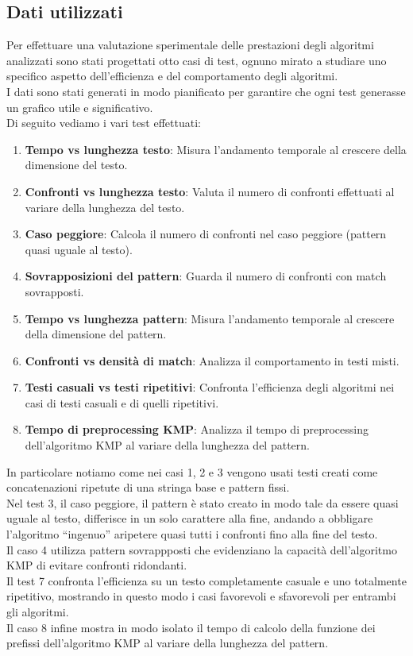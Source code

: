 \documentclass{article}
\begin{document}
\subsection{Dati utilizzati}
Per effettuare una valutazione sperimentale delle prestazioni degli algoritmi analizzati sono stati progettati otto casi di test, ognuno mirato a studiare uno specifico aspetto dell'efficienza e del comportamento degli algoritmi.\\
I dati sono stati generati in modo pianificato per garantire che ogni test generasse un grafico utile e significativo.\\
Di seguito vediamo i vari test effettuati:
\begin{enumerate}
    \item \textbf{Tempo vs lunghezza testo}: Misura l'andamento temporale al crescere della dimensione del testo.
    \item \textbf{Confronti vs lunghezza testo}: Valuta il numero di confronti effettuati al variare della lunghezza del testo.
    \item \textbf{Caso peggiore}: Calcola il numero di confronti nel caso peggiore (pattern quasi uguale al testo).
    \item \textbf{Sovrapposizioni del pattern}: Guarda il numero di confronti con match sovrapposti.
    \item \textbf{Tempo vs lunghezza pattern}: Misura l'andamento temporale al crescere della dimensione del pattern.
    \item \textbf{Confronti vs densità di match}: Analizza il comportamento in testi misti.
    \item \textbf{Testi casuali vs testi ripetitivi}: Confronta l'efficienza degli algoritmi nei casi di testi casuali e di quelli ripetitivi.
    \item \textbf{Tempo di preprocessing KMP}: Analizza il tempo di preprocessing dell'algoritmo KMP al variare della lunghezza del pattern.
\end{enumerate}
In particolare notiamo come nei casi 1, 2 e 3 vengono usati testi creati come concatenazioni ripetute di una stringa base e pattern fissi.\\
Nel test 3, il caso peggiore, il pattern è stato creato in modo tale da essere quasi uguale al testo, differisce in un solo carattere alla fine, andando a obbligare l'algoritmo ``ingenuo'' aripetere quasi tutti i confronti fino alla fine del testo.\\
Il caso 4 utilizza pattern sovrappposti che evidenziano la capacità dell'algoritmo KMP di evitare confronti ridondanti.\\
Il test 7 confronta l'efficienza su un testo completamente casuale e uno totalmente ripetitivo, mostrando in questo modo i casi favorevoli e sfavorevoli per entrambi gli algoritmi.\\
Il caso 8 infine mostra in modo isolato il tempo di calcolo della funzione dei prefissi dell'algoritmo KMP al variare della lunghezza del pattern.\\
\end{document}
